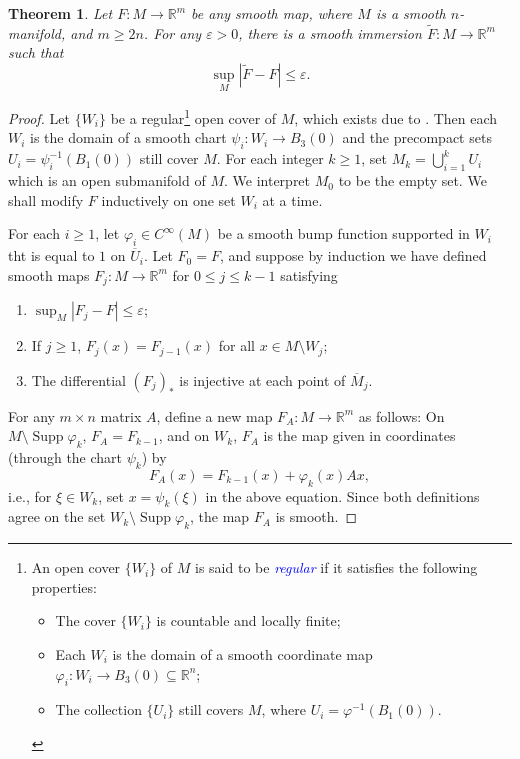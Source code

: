 \documentclass[11pt]{article}
\theoremstyle{thmstyle}
\newtheorem{theorem}{Theorem}[section]
\theoremstyle{defstyle}
\newcommand{\R}{\mathbb{R}}
\newcommand{\Supp}{\operatorname{Supp}}
\newcommand{\wt}[1]{\widetilde{#1}}
\newcommand{\define}[1]{\textcolor{blue}{\textit{#1}}}
\renewcommand{\le}{\leqslant}
\renewcommand{\ge}{\geqslant}
\begin{document}
\begin{theorem}
	Let $F\colon M\to\R^m$ be any smooth map, where $M$ is a smooth $n$-manifold, and $m\ge 2n$. For any $\varepsilon > 0$, there is a smooth immersion $\wt F\colon M\to\R^m$ such that 
	\begin{equation*}
		\sup_{M}|\wt F - F|\le\varepsilon.
	\end{equation*}
\end{theorem}
\begin{proof}
	Let $\{W_i\}$ be a regular\footnote{
		An open cover $\{W_i\}$ of $M$ is said to be \define{regular} if it satisfies the following properties: 
		\begin{itemize}
			\item The cover $\{W_i\}$ is countable and locally finite;
			\item Each $W_i$ is the domain of a smooth coordinate map $\varphi_i\colon W_i\to B_3(0)\subseteq\R^n$;
			\item The collection $\{U_i\}$ still covers $M$, where $U_i = \varphi^{-1}\left(B_1(0)\right)$.
		\end{itemize}
	} open cover of $M$, which exists due to \cite[Proposition 2.24]{lee-smooth-manifolds}. Then each $W_i$ is the domain of a smooth chart $\psi_i\colon W_i\to B_3(0)$ and the precompact sets $U_i = \psi_i^{-1}\left(B_1(0)\right)$ still cover $M$. For each integer $k\ge 1$, set $M_k = \bigcup_{i = 1}^k U_i$ which is an open submanifold of $M$. We interpret $M_0$ to be the empty set. We shall modify $F$ inductively on one set $W_i$ at a time.

	For each $i\ge 1$, let $\varphi_i\in C^\infty(M)$ be a smooth bump function supported in $W_i$ tht is equal to $1$ on $\overline U_i$. Let $F_0 = F$, and suppose by induction we have defined smooth maps $F_j\colon M\to\R^m$ for $0\le j\le k - 1$ satisfying 
	\begin{enumerate}[label=(\roman*)]
		\item $\displaystyle\sup_{M}|F_j - F|\le\varepsilon$; \label{closeness}
		\item If $j\ge 1$, $F_j(x) = F_{j - 1}(x)$ for all $x\in M\setminus W_j$; \label{second-condition}
		\item The differential $(F_j)_\ast$ is injective at each point of $\overline M_j$. \label{third-condition}
	\end{enumerate}

	For any $m\times n$ matrix $A$, define a new map $F_A\colon M\to\R^m$ as follows: On $M\setminus\Supp\varphi_k$, $F_A = F_{k - 1}$, and on $W_k$, $F_A$ is the map given in coordinates (through the chart $\psi_k$) by 
	\begin{equation*}
		F_A(x) = F_{k - 1}(x) + \varphi_k(x) Ax,
	\end{equation*}
	i.e., for $\xi\in W_k$, set $x = \psi_k(\xi)$ in the above equation. Since both definitions agree on the set $W_k\setminus\Supp\varphi_k$, the map $F_A$ is smooth.


\end{proof}
\end{document}
